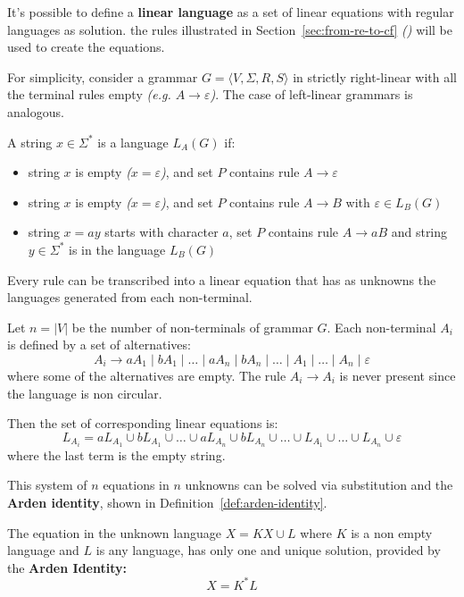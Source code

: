 \documentclass[english]{article}
\begin{document}
It's possible to define a \textbf{linear language} as a set of linear equations with regular languages as solution.
the rules illustrated in Section~\ref{sec:from-re-to-cf} \textit{()} will be used to create the equations.

For simplicity, consider a grammar \(G = \langle V, \Sigma, R, S \rangle\) in strictly right-linear with all the terminal rules empty \textit{(e.g. \(A \rightarrow \varepsilon\))}.
The case of left-linear grammars is analogous.

A string \(x \in \Sigma^\ast\) is a language \(L_A(G)\) if:

\begin{itemize}
  \item string \(x\) is empty \textit{(\(x = \varepsilon\))}, and set \(P\) contains rule \(A \rightarrow \varepsilon\)
  \item string \(x\) is empty \textit{(\(x = \varepsilon\))}, and set \(P\) contains rule \(A \rightarrow B\) with \(\varepsilon \in L_B(G)\)
  \item string \(x = ay\) starts with character \(a\), set \(P\) contains rule \(A \rightarrow aB\) and string \(y \in \Sigma^\ast\) is in the language \(L_B(G)\)
\end{itemize}

Every rule can be transcribed into a linear equation that has as unknowns the languages generated from each non-terminal.

Let \(n = |V|\) be the number of non-terminals of grammar \(G\).
Each non-terminal \(A_i\) is defined by a set of alternatives:
\[ A_i \rightarrow a A_1 \mid b A_1 \mid \ldots \mid a A_n \mid b A_n \mid \ldots \mid A_1 \mid \ldots \mid A_n \mid \varepsilon \]
where some of the alternatives are empty. The rule \(A_i \rightarrow A_i\) is never present since the language is non circular.

Then the set of corresponding linear equations is:
\[ L_{A_i} = a L_{A_1} \cup b L_{A_1} \cup \ldots \cup a L_{A_n} \cup b L_{A_n} \cup \ldots \cup L_{A_1} \cup \ldots \cup L_{A_n} \cup \varepsilon \]
where the last term is the empty string.

This system of \(n\) equations in \(n\) unknowns can be solved via substitution and the \textbf{Arden identity}, shown in Definition~\ref{def:arden-identity}.

\begin{definition}
  \label{def:arden-identity}
  The equation in the unknown language \(X= K X \cup L\) where \(K\) is a non empty language and \(L\) is any language, has only one and unique solution, provided by the \textbf{Arden Identity:}
  \[ X = K^\ast L \]
\end{definition}
\end{document}
